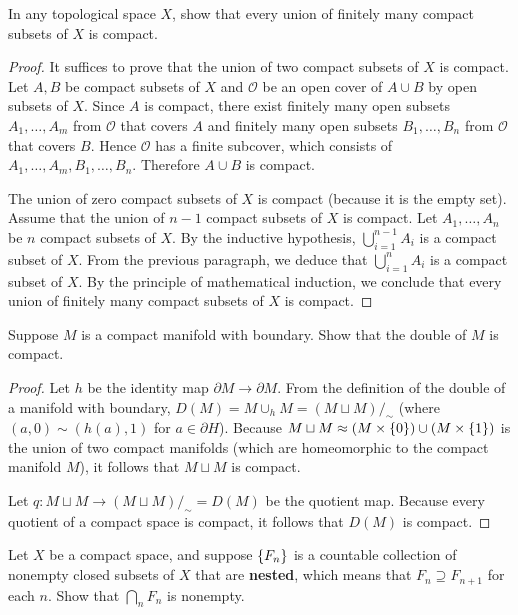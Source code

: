 \begin{exercise}{4.29}
	In any topological space $X$, show that every union of finitely many compact subsets of $X$ is compact.
\end{exercise}

\begin{proof}
	It suffices to prove that the union of two compact subsets of $X$ is compact. Let $A, B$ be compact subsets of $X$ and $\mathcal{O}$ be an open cover of $A\cup B$ by open subsets of $X$. Since $A$ is compact, there exist finitely many open subsets $A_{1}, \ldots, A_{m}$ from $\mathcal{O}$ that covers $A$ and finitely many open subsets $B_{1}, \ldots, B_{n}$ from $\mathcal{O}$ that covers $B$. Hence $\mathcal{O}$ has a finite subcover, which consists of $A_{1}, \ldots, A_{m}, B_{1}, \ldots, B_{n}$. Therefore $A\cup B$ is compact.

	The union of zero compact subsets of $X$ is compact (because it is the empty set). Assume that the union of $n - 1$ compact subsets of $X$ is compact. Let $A_{1}, \ldots, A_{n}$ be $n$ compact subsets of $X$. By the inductive hypothesis, $\bigcup^{n-1}_{i=1}A_{i}$ is a compact subset of $X$. From the previous paragraph, we deduce that $\bigcup^{n}_{i=1}A_{i}$ is a compact subset of $X$. By the principle of mathematical induction, we conclude that every union of finitely many compact subsets of $X$ is compact.
\end{proof}

\begin{exercise}{4.37}
	Suppose $M$ is a compact manifold with boundary. Show that the double of $M$ is compact.
\end{exercise}

\begin{proof}
	Let $h$ be the identity map $\partial M\to \partial M$. From the definition of the double of a manifold with boundary, $D(M) = M\cup_{h} M = {(M\sqcup M)}/_{\sim}$ (where $(a, 0) \sim (h(a), 1)$ for $a\in \partial H$). Because $M\sqcup M \approx (M\times\left\{{0}\right\}) \cup (M\times\left\{{1}\right\})$ is the union of two compact manifolds (which are homeomorphic to the compact manifold $M$), it follows that $M\sqcup M$ is compact.

	Let $q: M\sqcup M \to (M\sqcup M)/_{\sim} = D(M)$ be the quotient map. Because every quotient of a compact space is compact, it follows that $D(M)$ is compact.
\end{proof}

\begin{exercise}{4.38}
	Let $X$ be a compact space, and suppose $\left\{{F_{n}}\right\}$ is a countable collection of nonempty closed subsets of $X$ that are \textbf{nested}, which means that $F_{n}\supseteq F_{n+1}$ for each $n$. Show that $\bigcap_{n}F_{n}$ is nonempty.
\end{exercise}

